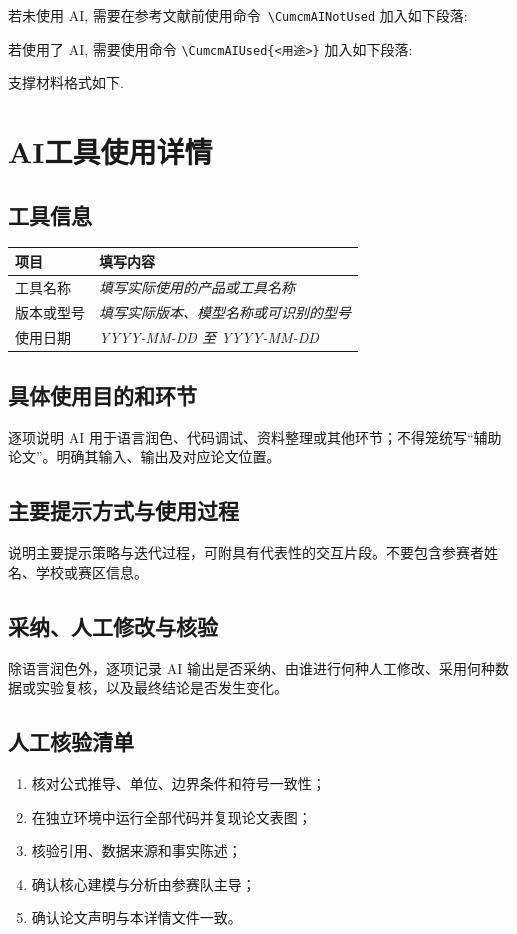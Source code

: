 若未使用 AI, 需要在参考文献前使用命令~\verb|\CumcmAINotUsed| 加入如下段落:

\CumcmAINotUsed

若使用了 AI, 需要使用命令 \verb|\CumcmAIUsed{<用途>}| 加入如下段落:

支撑材料格式如下.

\section*{AI工具使用详情}

\subsection*{工具信息}
\noindent
\begin{tabularx}{\textwidth}{@{}XX@{}}
  \toprule
  项目 & 填写内容 \\
  \midrule
  工具名称 & \textit{填写实际使用的产品或工具名称} \\
  版本或型号 & \textit{填写实际版本、模型名称或可识别的型号} \\
  使用日期 & \textit{YYYY-MM-DD 至 YYYY-MM-DD} \\
  \bottomrule
\end{tabularx}

\subsection*{具体使用目的和环节}

逐项说明 AI 用于语言润色、代码调试、资料整理或其他环节；不得笼统写“辅助论文”。明确其输入、输出及对应论文位置。

\subsection*{主要提示方式与使用过程}

说明主要提示策略与迭代过程，可附具有代表性的交互片段。不要包含参赛者姓名、学校或赛区信息。

\subsection*{采纳、人工修改与核验}

除语言润色外，逐项记录 AI 输出是否采纳、由谁进行何种人工修改、采用何种数据或实验复核，以及最终结论是否发生变化。

\subsection*{人工核验清单}

\begin{enumerate}[label=\arabic*)]
  \item 核对公式推导、单位、边界条件和符号一致性；
  \item 在独立环境中运行全部代码并复现论文表图；
  \item 核验引用、数据来源和事实陈述；
  \item 确认核心建模与分析由参赛队主导；
  \item 确认论文声明与本详情文件一致。
\end{enumerate}
